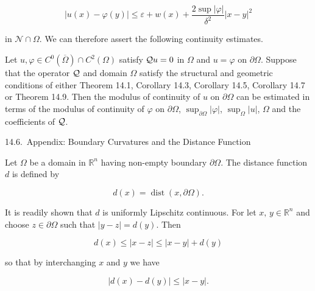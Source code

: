 \begin{equation}
|u(x) - \varphi(y)| \leq \varepsilon + w(x) + \frac{2 \sup |\varphi|}{\delta^2} |x - y|^2
\tag{14.89}
\end{equation}

in $\mathcal N \cap \Omega$. We can therefore assert the following continuity estimates.

\begin{theorem}[14.15]\label{gt14-boundary-gradient-14-15}
Let $u, \varphi \in C^0(\overline{\Omega}) \cap C^2(\Omega)$ satisfy $\mathcal{Q} u = 0$ in $\Omega$ and $u = \varphi$ on $\partial\Omega$.
Suppose that the operator $\mathcal{Q}$ and domain $\Omega$ satisfy the structural and geometric
conditions of either Theorem 14.1, Corollary 14.3, Corollary 14.5, Corollary 14.7 or
Theorem 14.9. Then the modulus of continuity of $u$ on $\partial\Omega$ can be estimated in terms of
the modulus of continuity of $\varphi$ on $\partial\Omega$, $\sup_{\partial\Omega} |\varphi|$, $\sup_{\Omega} |u|$, $\Omega$ and the coefficients of $\mathcal{Q}$.
\end{theorem}


\setcounter{page}{354}

14.6.\ Appendix: Boundary Curvatures and the Distance Function

Let $\Omega$ be a domain in $\mathbb{R}^n$ having non-empty boundary $\partial\Omega$. The distance function $d$
is defined by

\begin{equation}
d(x)=\operatorname{dist}(x,\partial\Omega).
\tag{14.90}
\end{equation}

It is readily shown that $d$ is uniformly Lipschitz continuous. For let $x,\, y \in \mathbb{R}^n$ and
choose $z \in \partial\Omega$ such that $|y-z|=d(y)$. Then

\[
d(x)\le |x-z|\le |x-y|+d(y)
\]

so that by interchanging $x$ and $y$ we have

\begin{equation}
|d(x)-d(y)|\le |x-y|.
\tag{14.91}
\end{equation}

